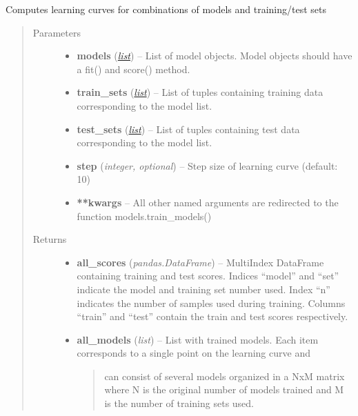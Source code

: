\documentclass[letterpaper,10pt,english]{sphinxmanual}
\begin{document}
\begin{fulllineitems}
\label{classification:flamingo.classification.test.compute_learning_curve}
Computes learning curves for combinations of models and training/test sets
\begin{quote}\begin{description}
\item[{Parameters}] \leavevmode\begin{itemize}
\item {} 
\textbf{models} (\href{http://docs.python.org/library/functions.html\#list}{\emph{list}}) -- List of model objects. Model objects should have a fit() and score() method.

\item {} 
\textbf{train\_sets} (\href{http://docs.python.org/library/functions.html\#list}{\emph{list}}) -- List of tuples containing training data corresponding to the model list.

\item {} 
\textbf{test\_sets} (\href{http://docs.python.org/library/functions.html\#list}{\emph{list}}) -- List of tuples containing test data corresponding to the model list.

\item {} 
\textbf{step} (\emph{integer, optional}) -- Step size of learning curve (default: 10)

\item {} 
\textbf{**kwargs} -- 
All other named arguments are redirected to the function models.train\_models()


\end{itemize}

\item[{Returns}] \leavevmode
\begin{itemize}
\item {} 
\textbf{all\_scores} (\emph{pandas.DataFrame}) --
MultiIndex DataFrame containing training and test scores.
Indices ``model'' and ``set'' indicate the model and training set number used.
Index ``n'' indicates the number of samples used during training.
Columns ``train'' and ``test'' contain the train and test scores respectively.

\item {} 
\textbf{all\_models} (\emph{list}) --
List with trained models.
Each item corresponds to a single point on the learning curve and
\begin{quote}

can consist of several models organized in a NxM matrix where
N is the original number of models trained and M is the number
of training sets used.
\end{quote}

\end{itemize}


\end{description}\end{quote}

\end{fulllineitems}
\end{document}
